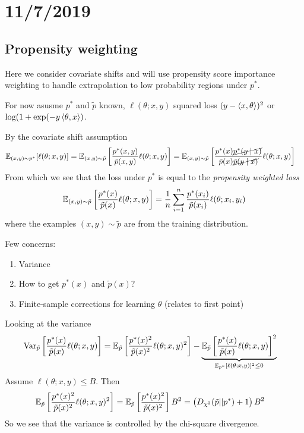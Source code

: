 \section{11/7/2019}

\subsection{Propensity weighting}

Here we consider covariate shifts and will use propensity score importance
weighting to handle extrapolation to low probability regions under $p^*$.

For now asusme $p^*$ and $\tilde{p}$ known, $\ell(\theta; x,y)$ squared loss
$(y - \braket{x,\theta})^2$ or $\log(1+\exp(-y \braket{\theta,x})$.

By the covariate shift assumption
\begin{align}
  \mathbb{E}_{(x,y) \sim p^*}[\ell(\theta; x,y)]
  &= \mathbb{E}_{(x,y) \sim \tilde{p}} \left[ \frac{p^*(x,y)}{\tilde{p}(x,y)} \ell(\theta; x,y) \right]
  = \mathbb{E}_{(x,y) \sim \tilde{p}} \left[
    \frac{p^*(x) \cancel{p^*(y \mid x)}}{\tilde{p}(x) \cancel{\tilde{p}(y \mid x)}} \ell(\theta; x,y)
  \right]
\end{align}
From which we see that the loss under $p^*$ is equal to
the \emph{propensity weighted loss}
\begin{align}
  \mathbb{E}_{(x,y) \sim \tilde{p}} \left[ \frac{p^*(x)}{\tilde{p}(x)} \ell(\theta; x,y) \right]
  = \frac{1}{n}  \sum_{i=1}^n \frac{p^*(x_i)}{\tilde{p}(x_i)} \ell(\theta; x_i, y_i)
\end{align}
where the examples $(x,y) \sim \tilde{p}$ are from the training distribution.

Few concerns:
\begin{enumerate}
  \item Variance
  \item How to get $p^*(x)$ and $\tilde{p}(x)$?
  \item Finite-sample corrections for learning $\theta$ (relates to first point)
\end{enumerate}

Looking at the variance
\begin{align}
  \operatorname{Var}_{\tilde{p}}\left[
    \frac{p^*(x)}{\tilde{p}(x)} \ell(\theta; x,y)
  \right]
  &= \mathbb{E}_{\tilde{p}}\left[
    \frac{p^*(x)^2}{\tilde{p}(x)^2} \ell(\theta; x,y)^2
    \right] - \underbrace{\mathbb{E}_{\tilde{p}}\left[
      \frac{p^*(x)}{\tilde{p}(x)} \ell(\theta; x, y)
    \right]^2}_{\mathbb{E}_{p^*}[\ell(\theta; x,y)]^2 \leq 0}
\end{align}
Assume $\ell(\theta; x, y) \leq B$. Then
\begin{align}
  \mathbb{E}_{\tilde{p}}\left[
    \frac{p^*(x)^2}{\tilde{p}(x)^2} \ell(\theta; x,y)^2
  \right]
  &= \mathbb{E}_{\tilde{p}}\left[
    \frac{p^*(x)^2}{\tilde{p}(x)^2}
  \right] B^2
  = \left( D_{\chi^2}(\tilde{p} || p^*) + 1\right)B^2
\end{align}
So we see that the variance is controlled by the chi-square divergence.

